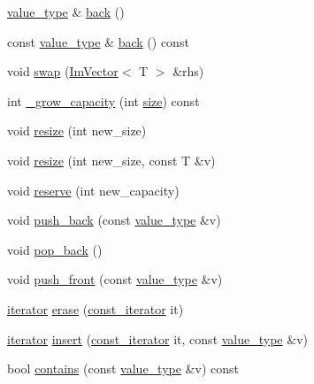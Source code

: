 \begin{DoxyCompactItemize}
\item 
\hyperlink{class_im_vector_a8bd77e4e7581d8e5f9e98d7c2f3c2a80}{value\+\_\+type} \& \hyperlink{class_im_vector_a3e4424d3fca190894598a6575f9d2401}{back} ()
\item 
const \hyperlink{class_im_vector_a8bd77e4e7581d8e5f9e98d7c2f3c2a80}{value\+\_\+type} \& \hyperlink{class_im_vector_a6f22918d4f139a1c4c3410ccae726f81}{back} () const
\item 
void \hyperlink{class_im_vector_afcec0d2a1e28aebe412b6efd06f0a77a}{swap} (\hyperlink{class_im_vector}{Im\+Vector}$<$ T $>$ \&rhs)
\item 
int \hyperlink{class_im_vector_af9dfc79dfd89c904830bebc492a18310}{\+\_\+grow\+\_\+capacity} (int \hyperlink{class_im_vector_a8c903ecb1aaee0601b6a8ad835a4a435}{size}) const
\item 
void \hyperlink{class_im_vector_ac371dd62e56ae486b1a5038cf07eee56}{resize} (int new\+\_\+size)
\item 
void \hyperlink{class_im_vector_abe7f21776ecfb7d0214963fd8c0689f0}{resize} (int new\+\_\+size, const T \&v)
\item 
void \hyperlink{class_im_vector_a0f14f5736c3372157856eebb67123b75}{reserve} (int new\+\_\+capacity)
\item 
void \hyperlink{class_im_vector_a68387993f2a5f5c3b2a7139d9ab778b8}{push\+\_\+back} (const \hyperlink{class_im_vector_a8bd77e4e7581d8e5f9e98d7c2f3c2a80}{value\+\_\+type} \&v)
\item 
void \hyperlink{class_im_vector_a3db7ce62d3c429effdb893fbf7148c1c}{pop\+\_\+back} ()
\item 
void \hyperlink{class_im_vector_a9a21cfec59d057cba605da14682180d2}{push\+\_\+front} (const \hyperlink{class_im_vector_a8bd77e4e7581d8e5f9e98d7c2f3c2a80}{value\+\_\+type} \&v)
\item 
\hyperlink{class_im_vector_a74b5478f1f6fd471cc71219bce483db6}{iterator} \hyperlink{class_im_vector_a1e1fd9b678be9d4b4432fbefde976045}{erase} (\hyperlink{class_im_vector_aedeac9c5080f9d6ce96ae837768ee4c4}{const\+\_\+iterator} it)
\item 
\hyperlink{class_im_vector_a74b5478f1f6fd471cc71219bce483db6}{iterator} \hyperlink{class_im_vector_a52fdb731c13c82a1fd971186c6a701b5}{insert} (\hyperlink{class_im_vector_aedeac9c5080f9d6ce96ae837768ee4c4}{const\+\_\+iterator} it, const \hyperlink{class_im_vector_a8bd77e4e7581d8e5f9e98d7c2f3c2a80}{value\+\_\+type} \&v)
\item 
bool \hyperlink{class_im_vector_a8d3d5f3462afbf38d9e8f410ebd085ee}{contains} (const \hyperlink{class_im_vector_a8bd77e4e7581d8e5f9e98d7c2f3c2a80}{value\+\_\+type} \&v) const
\end{DoxyCompactItemize}

